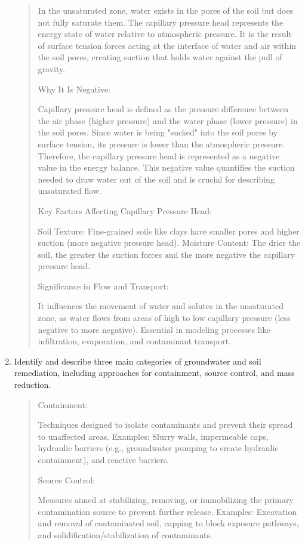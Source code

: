 \documentclass[12pt]{article}
\begin{document}
\begin{enumerate}
\begin{quote}
In the unsaturated zone, water exists in the pores of the soil but does not fully saturate them. The capillary pressure head represents the energy state of water relative to atmospheric pressure. It is the result of surface tension forces acting at the interface of water and air within the soil pores, creating suction that holds water against the pull of gravity.

Why It Is Negative:

Capillary pressure head is defined as the pressure difference between the air phase (higher pressure) and the water phase (lower pressure) in the soil pores. Since water is being "sucked" into the soil pores by surface tension, its pressure is lower than the atmospheric pressure. Therefore, the capillary pressure head is represented as a negative value in the energy balance. This negative value quantifies the suction needed to draw water out of the soil and is crucial for describing unsaturated flow.

Key Factors Affecting Capillary Pressure Head:

Soil Texture: Fine-grained soils like clays have smaller pores and higher suction (more negative pressure head).
Moisture Content: The drier the soil, the greater the suction forces and the more negative the capillary pressure head.

Significance in Flow and Transport:

It influences the movement of water and solutes in the unsaturated zone, as water flows from areas of high to low capillary pressure (less negative to more negative).
Essential in modeling processes like infiltration, evaporation, and contaminant transport.
\end{quote}
\clearpage

\item Identify and describe three main categories of groundwater and soil remediation, including approaches for containment, source control, and mass reduction.

\begin{quote}

Containment:

Techniques designed to isolate contaminants and prevent their spread to unaffected areas.
Examples: Slurry walls, impermeable caps, hydraulic barriers (e.g., groundwater pumping to create hydraulic containment), and reactive barriers.

Source Control:

Measures aimed at stabilizing, removing, or immobilizing the primary contamination source to prevent further release.
Examples: Excavation and removal of contaminated soil, capping to block exposure pathways, and solidification/stabilization of contaminants.


\end{quote}
\end{enumerate}
\end{document}

